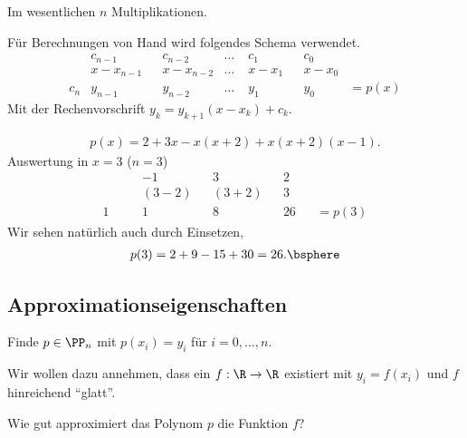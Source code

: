 \begin{bemn}[Rechenaufwand.]
Im wesentlichen $n$ Multiplikationen.
\end{bemn}

Für Berechnungen von Hand wird folgendes Schema verwendet.
\begin{align*}
&c_{n-1} && c_{n-2} & \ldots\; & c_1 && c_0\\
&x-x_{n-1} && x-x_{n-2} & \ldots\; & x-x_1 && x-x_0\\\hline
c_n & y_{n-1} && y_{n-2} & \ldots\; & y_1 && y_0 & = p(x)
\end{align*}
Mit der Rechenvorschrift $y_k = y_{k+1}(x-x_k)+c_k$.

\begin{bspn}
\begin{align*}
p(x) = 2 + 3x - x(x+2) + x(x+2)(x-1).
\end{align*}
Auswertung in $x=3$ ($n=3$)
\begin{align*}
&&-1 && 3 && 2\\
&&(3-2) && (3+2) && 3\\\hline
1\quad && 1 && 8 && 26 && =p(3)
\end{align*}
Wir sehen natürlich auch durch Einsetzen,
\begin{align*}
p(3) = 2 + 9 - 15 + 30 = 26.\bsphere
\end{align*}
\end{bspn}

\subsection{Approximationseigenschaften}

\begin{bemn}[Interpolationsaufgabe.]
Finde $p\in \PP_n$ mit $p(x_i) = y_i$ für
$i=0,\ldots,n$.
\end{bemn}
Wir wollen dazu annehmen, dass ein $f:\R\to\R$ existiert mit $y_i = f(x_i)$ 
und $f$ hinreichend ``glatt''.

\begin{bemn}[Frage:]
Wie gut approximiert das Polynom $p$ die Funktion $f$?
\end{bemn}

